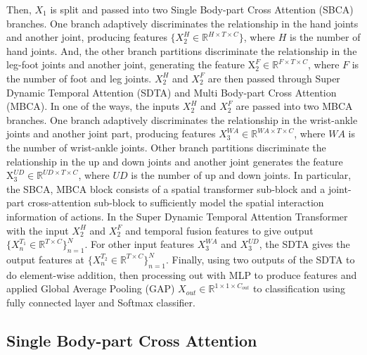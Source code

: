 \documentclass{bmvc2k}
\begin{document}
Then, $X_{1}$ is split and passed into two Single Body-part Cross Attention (SBCA) branches. One branch adaptively discriminates the relationship in the hand joints and another joint, producing features $\{X^{H}_{2}\in\mathbb{R}^{H\times T\times C}\}$, where  $H$ is the number of hand joints. And, the other branch partitions discriminate the relationship in the leg-foot joints and another joint, generating the feature $\mathrm{X}^{F}_{2}\in\mathbb{R}^{F\times T\times C}$, where $F$ is the number of foot and leg joints. $X^{H}_{2}$ and $X^{F}_{2}$ are then passed through Super Dynamic Temporal Attention (SDTA) and Multi Body-part Cross Attention (MBCA). In one of the ways, the inputs $X^{H}_{2}$ and $X^{F}_{2}$ are passed into two MBCA branches. One branch adaptively discriminates the relationship in the wrist-ankle joints and another joint part, producing features $X^{\mathit{WA}}_{3}\in\mathbb{R}^{\mathit{WA}\times T\times C}$, where $\mathit{WA}$ is the number of wrist-ankle joints. Other branch partitions discriminate the relationship in the up and down joints and another joint generates the feature $\mathrm{X}^{\mathit{UD}}_{3}\in\mathbb{R}^{\mathit{UD}\times T\times C}$, where $\mathit{UD}$ is the number of up and down joints. In particular, the SBCA, MBCA block consists of a spatial transformer sub-block and a joint-part cross-attention sub-block to sufficiently model the spatial interaction information of actions. In the Super Dynamic Temporal Attention Transformer with the input $X^{H}_{2}$ and $X^{F}_{2}$ and temporal fusion features to give output $\{X^{T_{1}}_{n}\in\mathbb{R}^{T\times C}\}^{N}_{n=1}$. For other input features $X^{\mathit{WA}}_{3}$ and $X^{\mathit{UD}}_{3}$, the SDTA gives the output features at $\{X^{T_{2}}_{n}\in \mathbb{R}^{T\times C}\}^{N}_{n=1}$. Finally, using two outputs of the SDTA to do element-wise addition, then processing out with MLP to produce features and applied Global Average Pooling (GAP) $X_{out}\in\mathbb{R}^{1\times 1\times C_{out}}$ to classification using fully connected layer and Softmax classifier.


\subsection{Single Body-part Cross Attention}
\end{document}
